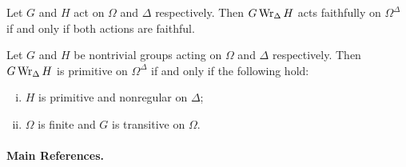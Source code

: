 \begin{proposition}
	Let $G$ and $H$ act on $\Omega$ and $\Delta$ respectively. Then $G\operatorname{Wr}_\Delta H$ acts faithfully on $\Omega^\Delta$ if and only if both actions are faithful. 
\end{proposition}
\begin{sketch}
	
\end{sketch}
\begin{proposition}
	Let $G$ and $H$ be nontrivial groups acting on $\Omega$ and $\Delta$ respectively. Then $G\operatorname{Wr}_{\Delta} H$ is primitive on $\Omega^\Delta$ if and only if the following hold:
\begin{enumerate}[(i)]
	\item $H$ is primitive and nonregular on $\Delta$;
	\item $\Omega$ is finite and $G$ is transitive on $\Omega$.
\end{enumerate}
\end{proposition}
\begin{sketch}
	
\end{sketch}

\paragraph{Main References.} \cite{Meldrum1995,Praeger2018,Dixon1996}

